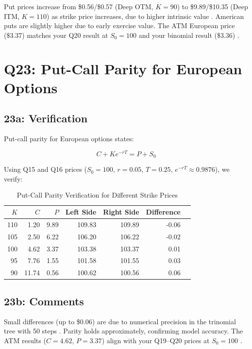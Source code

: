 \documentclass{article}
\begin{document}
Put prices increase from \$0.56/\$0.57 (Deep OTM, $K=90$) to \$9.89/\$10.35 (Deep ITM, $K=110$) as strike price increases, due to higher intrinsic value \citep{hull2018options}. American puts are slightly higher due to early exercise value. The ATM European price (\$3.37) matches your Q20 result at $S_0=100$ and your binomial result (\$3.36) \citep{shreve2004stochastic}.



\section*{Q23: Put-Call Parity for European Options}

\subsection*{23a: Verification}

Put-call parity for European options states:

\begin{equation}
C + Ke^{-rT} = P + S_0
\end{equation}

Using Q15 and Q16 prices ($S_0 = 100$, $r = 0.05$, $T = 0.25$, $e^{-rT} \approx 0.9876$), we verify:

\begin{table}[h]
\centering
\caption{Put-Call Parity Verification for Different Strike Prices}
\begin{tabular}{rrrrrrr}
\toprule
$K$ & $C$ & $P$ & Left Side & Right Side & Difference \\
\midrule
110 & 1.20 & 9.89 & 109.83 & 109.89 & -0.06 \\
105 & 2.50 & 6.22 & 106.20 & 106.22 & -0.02 \\
100 & 4.62 & 3.37 & 103.38 & 103.37 & 0.01 \\
95 & 7.76 & 1.55 & 101.58 & 101.55 & 0.03 \\
90 & 11.74 & 0.56 & 100.62 & 100.56 & 0.06 \\
\bottomrule
\end{tabular}
\end{table}

\subsection*{23b: Comments}

Small differences (up to \$0.06) are due to numerical precision in the trinomial tree with 50 steps \citep{hull2018options}. Parity holds approximately, confirming model accuracy. The ATM results ($C = 4.62$, $P = 3.37$) align with your Q19–Q20 prices at $S_0=100$ \citep{shreve2004stochastic}.
\end{document}
